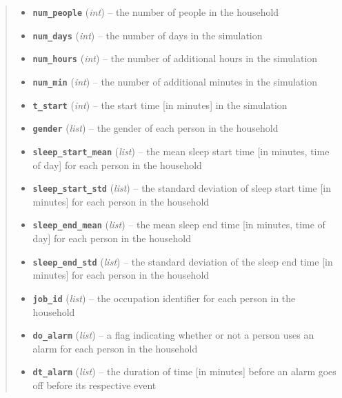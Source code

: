 \documentclass[letterpaper,10pt,english]{sphinxmanual}
\begin{document}
\begin{fulllineitems}
\begin{quote}
\begin{description}
\begin{itemize}
\item {} 
\textbf{\texttt{num\_people}} (\emph{int}) -- the number of people in the household

\item {} 
\textbf{\texttt{num\_days}} (\emph{int}) -- the number of days in the simulation

\item {} 
\textbf{\texttt{num\_hours}} (\emph{int}) -- the number of additional hours in the simulation

\item {} 
\textbf{\texttt{num\_min}} (\emph{int}) -- the number of additional minutes in the simulation

\item {} 
\textbf{\texttt{t\_start}} (\emph{int}) -- the start time {[}in minutes{]} in the simulation

\item {} 
\textbf{\texttt{gender}} (\emph{list}) -- the gender of each person in the household

\item {} 
\textbf{\texttt{sleep\_start\_mean}} (\emph{list}) -- the mean sleep start time {[}in minutes, time of day{]} for each person in     the household

\item {} 
\textbf{\texttt{sleep\_start\_std}} (\emph{list}) -- the standard deviation of sleep start time {[}in minutes{]} for each person in the     household

\item {} 
\textbf{\texttt{sleep\_end\_mean}} (\emph{list}) -- the mean sleep end time {[}in minutes, time of day{]} for each person in the household

\item {} 
\textbf{\texttt{sleep\_end\_std}} (\emph{list}) -- the standard deviation of the sleep end time {[}in minutes{]} for each person in     the household

\item {} 
\textbf{\texttt{job\_id}} (\emph{list}) -- the occupation identifier for each person in the household

\item {} 
\textbf{\texttt{do\_alarm}} (\emph{list}) -- a flag indicating whether or not a person uses an alarm for each person in the household

\item {} 
\textbf{\texttt{dt\_alarm}} (\emph{list}) -- the duration of time {[}in minutes{]} before an alarm goes off before its respective event


\end{itemize}
\end{description}
\end{quote}
\end{fulllineitems}
\end{document}
